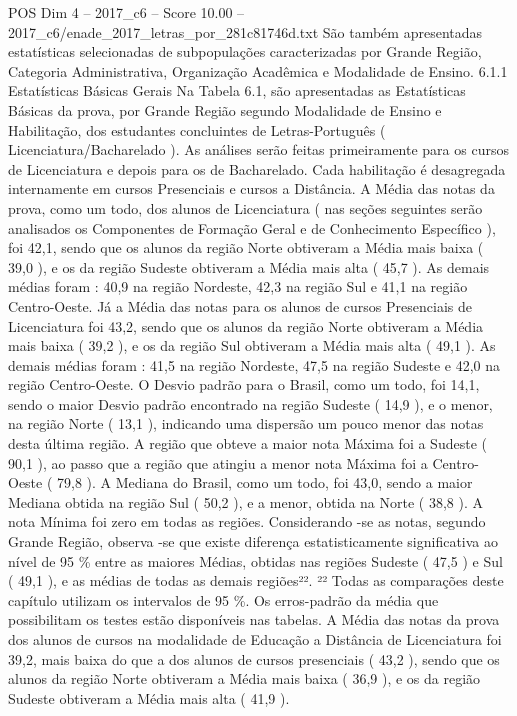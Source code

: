 \begin{textsample}{POS Dim 4 – 2017\_c6 – Score 10.00 – 2017\_c6/enade\_2017\_letras\_por\_281c81746d.txt}
São também apresentadas estatísticas selecionadas de subpopulações caracterizadas por Grande Região, Categoria Administrativa, Organização Acadêmica e Modalidade de Ensino. 6.1.1 Estatísticas Básicas Gerais Na Tabela 6.1, são apresentadas as Estatísticas Básicas da prova, por Grande Região segundo Modalidade de Ensino e Habilitação, dos estudantes concluintes de Letras-Português ( Licenciatura/Bacharelado ).
As análises serão feitas primeiramente para os cursos de Licenciatura e depois para os de Bacharelado.
Cada habilitação é desagregada internamente em cursos Presenciais e cursos a Distância.
A Média das notas da prova, como um todo, dos alunos de Licenciatura ( nas seções seguintes serão analisados os Componentes de Formação Geral e de Conhecimento Específico ), foi 42,1, sendo que os alunos da região Norte obtiveram a Média mais baixa ( 39,0 ), e os da região Sudeste obtiveram a Média mais alta ( 45,7 ).
As demais médias foram : 40,9 na região Nordeste, 42,3 na região Sul e 41,1 na região Centro-Oeste.
Já a Média das notas para os alunos de cursos Presenciais de Licenciatura foi 43,2, sendo que os alunos da região Norte obtiveram a Média mais baixa ( 39,2 ), e os da região Sul obtiveram a Média mais alta ( 49,1 ).
As demais médias foram : 41,5 na região Nordeste, 47,5 na região Sudeste e 42,0 na região Centro-Oeste.
O Desvio padrão para o Brasil, como um todo, foi 14,1, sendo o maior Desvio padrão encontrado na região Sudeste ( 14,9 ), e o menor, na região Norte ( 13,1 ), indicando uma dispersão um pouco menor das notas desta última região.
A região que obteve a maior nota Máxima foi a Sudeste ( 90,1 ), ao passo que a região que atingiu a menor nota Máxima foi a Centro-Oeste ( 79,8 ).
A Mediana do Brasil, como um todo, foi 43,0, sendo a maior Mediana obtida na região Sul ( 50,2 ), e a menor, obtida na Norte ( 38,8 ).
A nota Mínima foi zero em todas as regiões.
Considerando -se as notas, segundo Grande Região, observa -se que existe diferença estatisticamente significativa ao nível de 95 \% entre as maiores Médias, obtidas nas regiões Sudeste ( 47,5 ) e Sul ( 49,1 ), e as médias de todas as demais regiões²². ²² Todas as comparações deste capítulo utilizam os intervalos de 95 \%.
Os erros-padrão da média que possibilitam os testes estão disponíveis nas tabelas.
A Média das notas da prova dos alunos de cursos na modalidade de Educação a Distância de Licenciatura foi 39,2, mais baixa do que a dos alunos de cursos presenciais ( 43,2 ), sendo que os alunos da região Norte obtiveram a Média mais baixa ( 36,9 ), e os da região Sudeste obtiveram a Média mais alta ( 41,9 ).

\end{textsample}
